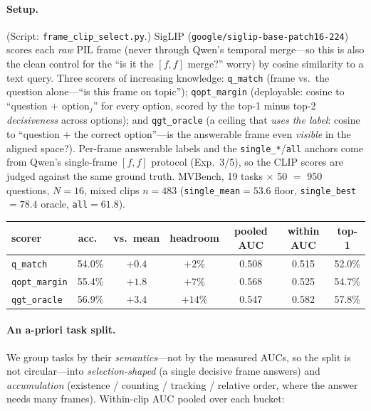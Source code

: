 \documentclass[11pt]{article}
\begin{document}
\paragraph{Setup.} (Script: \texttt{frame\_clip\_select.py}.) SigLIP
(\texttt{google/siglip-base-patch16-224}) scores each \emph{raw} PIL
frame (never through Qwen's temporal merge---so this is also the clean control for the ``is it
the $[f,f]$ merge?'' worry) by cosine similarity to a text query. Three scorers of increasing
knowledge: \texttt{q\_match} (frame vs.\ the question alone---``is this frame on topic'');
\texttt{qopt\_margin} (deployable: cosine to ``question $+$ option$_j$'' for every option,
scored by the top-1 minus top-2 \emph{decisiveness} across options); and \texttt{qgt\_oracle}
(a ceiling that \emph{uses the label}: cosine to ``question $+$ the correct option''---is the
answerable frame even \emph{visible} in the aligned space?). Per-frame answerable labels and the
\texttt{single\_*}/\texttt{all} anchors come from Qwen's single-frame $[f,f]$ protocol
(Exp.~3/5), so the CLIP scores are judged against the same ground truth. MVBench, 19 tasks
$\times$ 50 $=$ 950 questions, $N{=}16$, mixed clips $n{=}483$ (\texttt{single\_mean}$=53.6$
floor, \texttt{single\_best}$=78.4$ oracle, \texttt{all}$=61.8$).

\begin{center}
\begin{tabular}{lccc@{\hskip 2em}ccc}
\toprule
scorer & acc.\ & vs.\ mean & headroom & pooled AUC & within AUC & top-1 \\
\midrule
\texttt{q\_match}    & 54.0\% & $+0.4$ & $+2\%$  & 0.508 & 0.515 & 52.0\% \\
\texttt{qopt\_margin}& 55.4\% & $+1.8$ & $+7\%$  & 0.568 & 0.525 & 54.7\% \\
\texttt{qgt\_oracle} & 56.9\% & $+3.4$ & $+14\%$ & 0.547 & 0.582 & 57.8\% \\
\bottomrule
\end{tabular}
\end{center}

\paragraph{An a-priori task split.} We group tasks by their \emph{semantics}---not by the
measured AUCs, so the split is not circular---into \emph{selection-shaped} (a single decisive
frame answers) and \emph{accumulation} (existence / counting / tracking / relative order, where
the answer needs many frames). Within-clip AUC pooled over each bucket:
\end{document}
